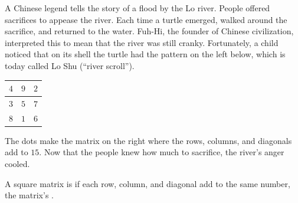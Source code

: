 A Chinese legend tells the story of a  
flood by the Lo river.
People offered sacrifices to appease the river.
Each time a turtle emerged, 
walked around the sacrifice, and returned to the water.
Fuh-Hi, %
the founder of Chinese civilization,
interpreted this to mean that
the river was still cranky.  
Fortunately, a child noticed 
that on its shell the turtle had the pattern on the left below, which is today
called Lo Shu (``river scroll'').
\begin{center}
  \hspace{.8in}
  \begin{tabular}{|c|c|c|}
    \hline
      $4$  &$9$  &$2$  \\ \hline
      $3$  &$5$  &$7$  \\ \hline
      $8$  &$1$  &$6$  \\ \hline    
  \end{tabular}
\end{center}
The dots make the matrix on the right where the
rows, columns, 
and diagonals add to $15$.
Now that the people knew how much to sacrifice, 
the river's anger cooled.

A square matrix is 
if each row, column, and diagonal add to the same
number, the matrix's .

